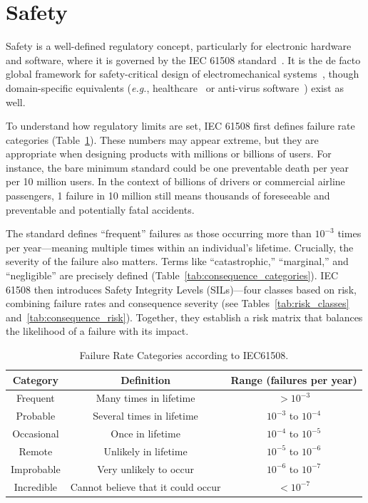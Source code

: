\section{Safety}
\label{safety}
Safety is a well-defined regulatory concept, particularly for electronic hardware and software, where it is governed by the IEC 61508 standard~\cite{IEC61508}. 
It is the de facto global framework for safety-critical design of electromechanical systems~\cite{todo}, though domain-specific equivalents (\textit{e.g.}, healthcare~\cite{hipaa} or anti-virus software~\cite{nist_antivirus}) exist as well.

To understand how regulatory limits are set, IEC 61508 first defines failure rate categories (Table~\ref{tab:failure_categories}). 
These numbers may appear extreme, but they are appropriate when designing products with millions or billions of users. 
For instance, the bare minimum standard could be one preventable death per year per 10 million users. 
In the context of billions of drivers or commercial airline passengers, 1 failure in 10 million still means thousands of foreseeable and preventable and potentially fatal accidents.

The standard defines ``frequent'' failures as those occurring more than $10^{-3}$ times per year—meaning multiple times within an individual's lifetime. 
Crucially, the severity of the failure also matters. 
Terms like ``catastrophic,'' ``marginal,'' and ``negligible'' are precisely defined (Table~\ref{tab:consequence_categories}). IEC 61508 then introduces Safety Integrity Levels (SILs)—four classes based on risk, combining failure rates and consequence severity (see Tables~\ref{tab:risk_classes} and~\ref{tab:consequence_risk}). 
Together, they establish a risk matrix that balances the likelihood of a failure with its impact.
 

\begin{table}[ht]
    \centering
    \caption{Failure Rate Categories according to IEC61508.}
    \begin{tabular}{ccc}
        \toprule
        Category & Definition & Range (failures per year) \\
        \midrule
        Frequent & Many times in lifetime & $> 10^{-3}$ \\
        Probable & Several times in lifetime & $10^{-3}$ to $10^{-4}$ \\
        Occasional & Once in lifetime & $10^{-4}$ to $10^{-5}$ \\
        Remote & Unlikely in lifetime & $10^{-5}$ to $10^{-6}$ \\
        Improbable & Very unlikely to occur & $10^{-6}$ to $10^{-7}$ \\
        Incredible & Cannot believe that it could occur & $< 10^{-7}$ \\
        \bottomrule
    \end{tabular}
    \label{tab:failure_categories}
\end{table}


